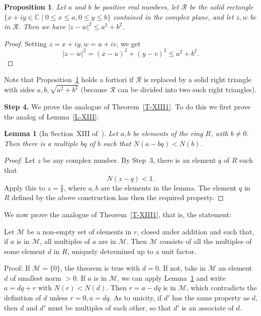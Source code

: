 \documentclass[12pt,letterpaper]{article}
\newcommand{\C}{\mathbb{C}}
\newtheorem{lem}[thm]{Lemma} %
\newtheorem{prop}[thm]{Proposition}
\theoremstyle{definition}
\begin{document}
\begin{prop}\label{Ptri2} 
Let $a$ and $b$ be positive real numbers, let $\mathcal{R}$ be the solid rectangle $\{x+iy\in\C\mid 0\le x\le a, 0\le y\le b\}$ contained in the complex plane, and let $z,w$ be in $\mathcal{R}$. Then we have $|z-w|^2\le a^2+b^2$. 
\end{prop} 

\begin{proof}
Setting $z=x+iy, w=u+iv$, we get 
$$
|z-w|^2=(x-u)^2+(y-v)^2\le a^2+b^2.
$$ 
\end{proof} 

Note that Proposition~\ref{Ptri2} holds a fortiori if $\mathcal{R}$ is replaced by a solid right triangle with sides $a,b,\sqrt{a^2+b^2}$ (because $\mathcal{R}$ can be divided into two such right triangles). 

\noindent\textbf{Step 4.} We prove the analogue of Theorem~\ref{T-XIII1}. To do this we first prove the analog of Lemma~\ref{L-XIII}: 

\begin{lem}[In Section~XIII of~\cite{weil1979}]\label{L-XIIIa}
Let $a, b$ be elements of the ring $R$, with $b\ne0$. Then there is a multiple $bq$ of $b$ such that $N(a-bq)<N(b)$. 
\end{lem} 
\begin{proof} 
Let $z$ be any complex number. By Step~3, there is an element $q$ of $R$ such that 
$$
N(z-q)<1.
$$ 
Apply this to $z=\frac{a}{b}$, where $a,b$ are the elements in the lemma. The element $q$ in $R$ defined by the above construction has then the required property. 
\end{proof} 

We now prove the analogue of Theorem~\ref{T-XIII1}, that is, the statement: 

Let $\mathcal{M}$ be a non-empty set of elements in $r$, closed under addition and such that, if $a$ is in $\mathcal{M}$, all multiples of $a$ are in $\mathcal{M}$. Then $\mathcal{M}$ consists of all the multiples of some element $d$ in $R$, uniquely determined up to a unit factor. 

Proof: If $\mathcal{M}=\{0\}$, the theorem is true with $d=0$. If not, take in $\mathcal{M}$ an element $d$ of smallest norm $> 0$. If $a$ is in $\mathcal{M}$, we can apply Lemma~\ref{L-XIIIa} and write $a=dq+r$ with $N(r)<N(d)$. Then $r=a-dq$ is in $\mathcal{M}$, which contradicts the definition of $d$ unless $r=0, a=dq$. As to unicity, if $d'$ has the same property as $d$, then $d$ and $d'$ must be multiples of each other, so that $d'$ is an associate of $d$.
\end{document}
